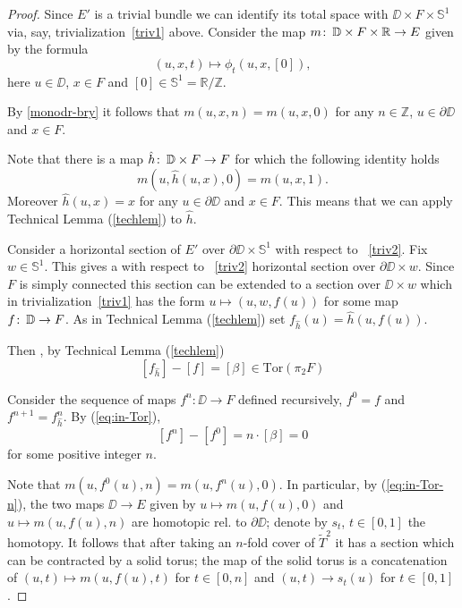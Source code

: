\documentclass{amsart}
\begin{document}
\begin{proof}
Since $E'$ is a trivial bundle we can identify its total space with $\DD\times F\times \mathbb{S}^1$ via, say, trivialization~\eqref{triv1} above. 
Consider the map  $m\colon\thinspace \mathbb{D}\times F\times \mathbb{R}\to E$ given by the formula 
\[(u,x,t)\mapsto \phi_t(u,x,[0]),\]
here $u\in \DD$, $x\in F$ and $[0]\in \mathbb{S}^1=\mathbb{R}/\mathbb{Z}$.

By \eqref{monodr-bry} it follows that  $m(u,x,n)=m(u,x,0)$ for any $n\in\mathbb{Z}$, $u\in \partial \DD$ and $x\in F$.

Note that there is a map $\hat h\colon\thinspace \mathbb{D}\times F\to F$ 
for which the following identity holds
\[m(u,\hat{h}(u,x),0)= m(u,x,1).\] 
Moreover $\hat h(u,x)=x$ for any $u\in\partial \DD$ and $x\in F$.
This means that we can apply Technical Lemma (\ref{techlem}) to $\hat h$.

Consider a horizontal section of $E'$ over $\partial \DD\times \mathbb{S}^1$ with respect to ~\eqref{triv2}. 
Fix $w\in \mathbb{S}^1$. 
This gives a with respect to ~\eqref{triv2} horizontal section over $\partial \DD\times w$.
Since 
 $F$ is simply connected this section can be extended to a section over $\DD\times w$ which in trivialization~\eqref{triv1} has the form $u\mapsto (u, w, f(u))$ for some map $f\colon\thinspace \mathbb{D}\to F$.
As in Technical Lemma (\ref{techlem}) set  $f_{\hat h}(u)= \hat h(u,f(u))$.

Then , by Technical Lemma (\ref{techlem})
\begin{equation}
\label{eq:in-Tor}
[f_{\hat h}]-[f]=[\beta]\in \mathrm{Tor}(\pi_2F)
\end{equation}


Consider the sequence of maps $f^n\colon \DD\to F$ defined recursively, $f^0=f$ and $f^{n+1}=f^n_{\hat h}$.
By (\ref{eq:in-Tor}),
\begin{equation}
\label{eq:in-Tor-n}
[f^n]-[f^0]=n{\cdot}[\beta]=0
\end{equation}
for some positive integer $n$.

Note that 
$m(u,f^0(u),n)=m(u,f^n(u),0)$.
In particular, by (\ref{eq:in-Tor-n}),
the two maps $\DD\to E$ given by $u\mapsto m(u,f(u),0)$ and $u\mapsto m(u,f(u),n)$ are homotopic rel. to $\partial \DD$;
denote by $s_t$, $t\in[0,1]$ the homotopy.
It follows that after taking an $n$-fold cover of $\widetilde T^2$ it has a section which can be contracted by a solid torus;
the map of the solid torus is a concatenation of $(u,t)\mapsto m(u,f(u),t)$ for $t\in[0,n]$ 
and $(u,t)\to s_t(u)$ for $t\in[0,1]$. 
\end{proof}
\end{document}

